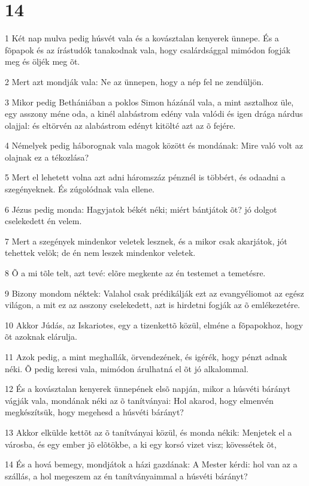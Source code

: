 \chapter{14}

\par 1 Két nap mulva pedig húsvét vala és a kovásztalan kenyerek ünnepe. És a fõpapok és az írástudók tanakodnak vala, hogy csalárdsággal mimódon fogják meg és öljék meg õt.
\par 2 Mert azt mondják vala: Ne az ünnepen, hogy a nép fel ne zendüljön.
\par 3 Mikor pedig Bethániában a poklos Simon házánál vala, a mint asztalhoz üle, egy asszony méne oda, a kinél alabástrom edény vala valódi és igen drága nárdus olajjal: és eltörvén az alabástrom edényt kitölté azt az õ fejére.
\par 4 Némelyek pedig háborognak vala magok között és mondának: Mire való volt az olajnak ez a tékozlása?
\par 5 Mert el lehetett volna azt adni háromszáz pénznél is többért, és odaadni a szegényeknek. És zúgolódnak vala ellene.
\par 6 Jézus pedig monda: Hagyjatok békét néki; miért bántjátok õt? jó dolgot cselekedett én velem.
\par 7 Mert a szegények mindenkor veletek lesznek, és a mikor csak akarjátok, jót tehettek velök; de én nem leszek mindenkor veletek.
\par 8 Õ a mi tõle telt, azt tevé: elõre megkente az én testemet a temetésre.
\par 9 Bizony mondom néktek: Valahol csak prédikálják ezt az evangyéliomot az egész világon, a mit ez az asszony cselekedett, azt is hirdetni fogják az õ emlékezetére.
\par 10 Akkor Júdás, az Iskariotes, egy a tizenkettõ közül, elméne a fõpapokhoz, hogy õt azoknak elárulja.
\par 11 Azok pedig, a mint meghallák, örvendezének, és igérék, hogy pénzt adnak néki. Õ pedig keresi vala, mimódon árulhatná el õt jó alkalommal.
\par 12 És a kovásztalan kenyerek ünnepének elsõ napján, mikor a húsvéti bárányt vágják vala, mondának néki az õ tanítványai: Hol akarod, hogy elmenvén megkészítsük, hogy megehesd a húsvéti bárányt?
\par 13 Akkor elkülde kettõt az õ tanítványai közül, és monda nékik: Menjetek el a városba, és egy ember jõ elõtökbe, a ki egy korsó vizet visz; kövessétek õt,
\par 14 És a hová bemegy, mondjátok a házi gazdának: A Mester kérdi: hol van az a szállás, a hol megeszem az én tanítványaimmal a húsvéti bárányt?
